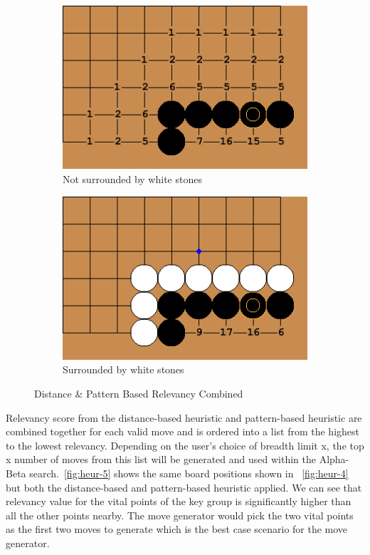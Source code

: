 \documentclass{l4proj}
\begin{document}
\begin{figure}[!ht]
\centering
\begin{subfigure}[b]{0.45\textwidth}
\centering
\includegraphics[width=\textwidth]{heur/5a.png}
\caption{Not surrounded by white stones}
\label{fig:heur-5a}
\end{subfigure}
\begin{subfigure}[b]{0.45\textwidth}
\centering
\includegraphics[width=\textwidth]{heur/5b.png}
\caption{Surrounded by white stones}
\label{fig:heur-5b}
\end{subfigure}
\caption{Distance \& Pattern Based Relevancy Combined}
\label{fig:heur-5}
\end{figure}


Relevancy score from the distance-based heuristic and pattern-based heuristic are combined together for each valid move and is ordered into a list from the highest to the lowest relevancy.  Depending on the user’s choice of breadth limit x,  the top x number of moves from this list will be generated and used  within the Alpha-Beta search.~\autoref{fig:heur-5} shows the same board positions shown in  ~\autoref{fig:heur-4} but both the distance-based and pattern-based heuristic applied. We can see that relevancy value for the vital points of the key group is significantly higher than all the other points nearby. The move generator would pick the two vital points as the first two moves to generate which is the best case scenario for the move generator.
\end{document}

